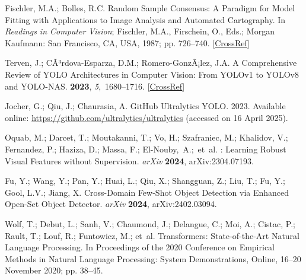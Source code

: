 \documentclass[12pt,a4paper,oneside]{report}
\begin{document}
\begin{thebibliography}{999}
Fischler, M.A.; Bolles, R.C.
\newblock Random {{Sample Consensus}}: {{A Paradigm}} for {{Model Fitting}}
with {{Applications}} to {{Image Analysis}} and {{Automated Cartography}}. In
{\em Readings in {{Computer Vision}}}; Fischler, M.A., Firschein, O., Eds.;
Morgan Kaufmann: San Francisco, CA, USA, 1987; pp. 726--740. [\href{http://dx.doi.org/10.1016/B978-0-08-051581-6.50070-2}{CrossRef}]

Terven, J.; CÃ³rdova-Esparza, D.M.; Romero-GonzÃ¡lez, J.A.
\newblock A Comprehensive Review of YOLO Architectures in Computer Vision: From
YOLOv1 to YOLOv8 and YOLO-NAS.
 {\bf 2023}, {\em
5},~1680--1716. [\href{http://dx.doi.org/10.3390/make5040083}{CrossRef}]

Jocher, G.; Qiu, J.; Chaurasia, A.
\newblock GitHub Ultralytics YOLO.  2023. Available online: \url{https://github.com/ultralytics/ultralytics} (accessed on 16 April 2025). 


Oquab, M.; Darcet, T.; Moutakanni, T.; Vo, H.; Szafraniec, M.; Khalidov, V.;
Fernandez, P.; Haziza, D.; Massa, F.; \mbox{{El-Nouby}, A.;  et~al.}
: {{Learning Robust Visual Features}} without
{{Supervision}}. {\em arXiv} {\bf2024}, arXiv:2304.07193. 

Fu, Y.; Wang, Y.; Pan, Y.; Huai, L.; Qiu, X.; Shangguan, Z.; Liu, T.; Fu, Y.;
Gool, L.V.; Jiang, X.
\newblock Cross-{{Domain Few-Shot Object Detection}} via {{Enhanced Open-Set
Object Detector}}. {\em arXiv} {\bf2024}, arXiv:2402.03094. 

Wolf, T.; Debut, L.; Sanh, V.; Chaumond, J.; Delangue, C.; Moi, A.; Cistac, P.;
Rault, T.; Louf, R.; Funtowicz, M.;  et~al.
\newblock Transformers: {{State-of-the-Art Natural Language Processing}}.
\newblock In Proceedings of the 2020 Conference on Empirical Methods in Natural Language Processing: System Demonstrations, Online, 16--20 November 2020; pp. 38--45. 


\end{thebibliography}
\end{document}
